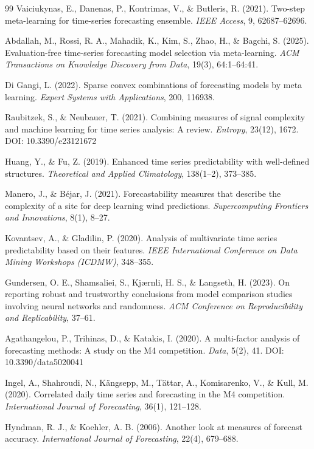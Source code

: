 {\begin{thebibliography}{99}
Vaiciukynas, E., Danenas, P., Kontrimas, V., \& Butleris, R. (2021). Two-step
meta-learning for time-series forecasting ensemble. \emph{IEEE Access}, 9,
62687--62696.

Abdallah, M., Rossi, R. A., Mahadik, K., Kim, S., Zhao, H., \& Bagchi, S. (2025).
Evaluation-free time-series forecasting model selection via meta-learning.
\emph{ACM Transactions on Knowledge Discovery from Data}, 19(3), 64:1--64:41.

Di Gangi, L. (2022). Sparse convex combinations of forecasting models by meta
learning. \emph{Expert Systems with Applications}, 200, 116938.

Raubitzek, S., \& Neubauer, T. (2021). Combining measures of signal complexity and
machine learning for time series analysis: A review. \emph{Entropy}, 23(12), 1672.
DOI: 10.3390/e23121672

Huang, Y., \& Fu, Z. (2019). Enhanced time series predictability with well-defined
structures. \emph{Theoretical and Applied Climatology}, 138(1--2), 373--385.

Manero, J., \& Béjar, J. (2021). Forecastability measures that describe the
complexity of a site for deep learning wind predictions.
\emph{Supercomputing Frontiers and Innovations}, 8(1), 8--27.

Kovantsev, A., \& Gladilin, P. (2020). Analysis of multivariate time series
predictability based on their features. \emph{IEEE International Conference on Data
Mining Workshops (ICDMW)}, 348--355.

Gundersen, O. E., Shamsaliei, S., Kj\ae{}rnli, H. S., \& Langseth, H. (2023). On reporting robust and
trustworthy conclusions from model comparison studies involving neural networks and
randomness. \emph{ACM Conference on Reproducibility and Replicability}, 37--61.

Agathangelou, P., Trihinas, D., \& Katakis, I. (2020). A multi-factor analysis of
forecasting methods: A study on the M4 competition. \emph{Data}, 5(2), 41.
DOI: 10.3390/data5020041

Ingel, A., Shahroudi, N., Kängsepp, M., Tättar, A., Komisarenko, V., \& Kull, M.
(2020). Correlated daily time series and forecasting in the M4 competition.
\emph{International Journal of Forecasting}, 36(1), 121--128.

Hyndman, R. J., \& Koehler, A. B. (2006).
Another look at measures of forecast accuracy.
\emph{International Journal of Forecasting}, 22(4), 679--688.

\end{thebibliography}
}
